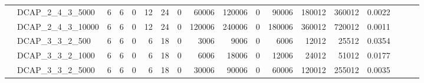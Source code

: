 \begin{landscape}
\begin{longtable}[c]{llrrrrrrrrrrrrrlll}
		& DCAP\_2\_4\_3\_5000          & 6                           & 6                          & 0                          & 12                          & 24                         & 0                          & 60006                      & 120006                    & 0                         & 90006                      & 180012                     & 360012                         & 0.0022                        &                          &                          &                          \\
		& DCAP\_2\_4\_3\_10000         & 6                           & 6                          & 0                          & 12                          & 24                         & 0                          & 120006                     & 240006                    & 0                         & 180006                     & 360012                     & 720012                         & 0.0011                        &                          &                          &                          \\
		& DCAP\_3\_3\_2\_500           & 6                           & 6                          & 0                          & 6                           & 18                         & 0                          & 3006                       & 9006                      & 0                         & 6006                       & 12012                      & 25512                          & 0.0354                        &                          &                          &                          \\
		& DCAP\_3\_3\_2\_1000          & 6                           & 6                          & 0                          & 6                           & 18                         & 0                          & 6006                       & 18006                     & 0                         & 12006                      & 24012                      & 51012                          & 0.0177                        &                          &                          &                          \\
		& DCAP\_3\_3\_2\_5000          & 6                           & 6                          & 0                          & 6                           & 18                         & 0                          & 30006                      & 90006                     & 0                         & 60006                      & 120012                     & 255012                         & 0.0035                        &                          &                          &                          \\

\end{longtable}
\end{landscape}
